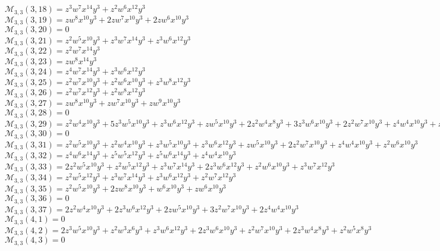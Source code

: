 \documentclass[12pt]{memoireuqam1.3}
\begin{document}
$\mathcal{M}_{3,3}(3,18)=z^3w^7x^{14}y^3+z^2w^6x^{12}y^3$\\
$\mathcal{M}_{3,3}(3,19)=zw^8x^{10}y^3+2zw^7x^{10}y^3+2zw^6x^{10}y^3$\\
$\mathcal{M}_{3,3}(3,20)=0$\\
$\mathcal{M}_{3,3}(3,21)=z^2w^5x^{10}y^3+z^3w^7x^{14}y^3+z^3w^6x^{12}y^3$\\
$\mathcal{M}_{3,3}(3,22)=z^2w^7x^{14}y^3$\\
$\mathcal{M}_{3,3}(3,23)=zw^8x^{14}y^3$\\
$\mathcal{M}_{3,3}(3,24)=z^4w^7x^{14}y^3+z^3w^6x^{12}y^3$\\
$\mathcal{M}_{3,3}(3,25)=z^2w^7x^{10}y^3+z^2w^6x^{10}y^3+z^3w^8x^{12}y^3$\\
$\mathcal{M}_{3,3}(3,26)=z^2w^7x^{12}y^3+z^2w^8x^{12}y^3$\\
$\mathcal{M}_{3,3}(3,27)=zw^8x^{10}y^3+zw^7x^{10}y^3+zw^9x^{10}y^3$\\
$\mathcal{M}_{3,3}(3,28)=0$\\
$\mathcal{M}_{3,3}(3,29)=z^2w^4x^{10}y^3+5z^3w^5x^{10}y^3+z^3w^6x^{12}y^3+zw^5x^{10}y^3+2z^2w^4x^8y^3+3z^3w^6x^{10}y^3+2z^2w^7x^{10}y^3+z^4w^4x^{10}y^3+z^2w^5x^8y^3$\\
$\mathcal{M}_{3,3}(3,30)=0$\\
$\mathcal{M}_{3,3}(3,31)=z^2w^5x^{10}y^3+z^2w^4x^{10}y^3+z^3w^5x^{10}y^3+z^3w^6x^{12}y^3+zw^5x^{10}y^3+2z^2w^7x^{10}y^3+z^4w^4x^{10}y^3+z^2w^6x^{10}y^3$\\
$\mathcal{M}_{3,3}(3,32)=z^4w^6x^{14}y^3+z^5w^5x^{12}y^3+z^5w^6x^{14}y^3+z^4w^4x^{10}y^3$\\
$\mathcal{M}_{3,3}(3,33)=2z^2w^5x^{10}y^3+z^2w^5x^{12}y^3+z^3w^7x^{14}y^3+2z^3w^6x^{12}y^3+z^2w^6x^{10}y^3+z^3w^7x^{12}y^3$\\
$\mathcal{M}_{3,3}(3,34)=z^2w^5x^{12}y^3+z^3w^7x^{14}y^3+z^3w^6x^{12}y^3+z^2w^7x^{12}y^3$\\
$\mathcal{M}_{3,3}(3,35)=z^2w^5x^{10}y^3+2zw^8x^{10}y^3+w^6x^{10}y^3+zw^6x^{10}y^3$\\
$\mathcal{M}_{3,3}(3,36)=0$\\
$\mathcal{M}_{3,3}(3,37)=2z^2w^4x^{10}y^3+2z^3w^6x^{12}y^3+2zw^5x^{10}y^3+3z^2w^7x^{10}y^3+2z^4w^4x^{10}y^3$\\
$\mathcal{M}_{3,3}(4,1)=0$\\
$\mathcal{M}_{3,3}(4,2)=2z^3w^5x^{10}y^3+z^2w^3x^6y^3+z^3w^6x^{12}y^3+2z^3w^6x^{10}y^3+z^2w^7x^{10}y^3+2z^3w^4x^8y^3+z^2w^5x^8y^3$\\
$\mathcal{M}_{3,3}(4,3)=0$\\
\end{document}

